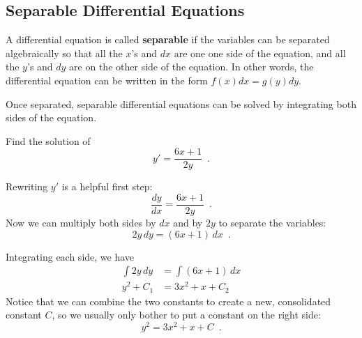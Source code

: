 
\subsection{Separable Differential Equations}
A differential equation is called {\bf separable} if the variables can be separated algebraically so that all the $x$'s and $dx$ are one one side of the equation, and all the $y$'s and $dy$ are on the other side of the equation. In other words, the differential equation can be written in the form $f(x)dx = g(y)dy$.

Once separated, separable differential equations can be solved by integrating both sides of the equation.

\begin{example}
Find the solution of
$$y'=\frac{6x+1}{2y} \enspace .$$

\begin{solution}
  Rewriting $y'$ is a helpful first step:
$$\frac{dy}{dx} = \frac{6x+1}{2y} \enspace .$$
Now we can multiply both sides by $dx$ and by $2y$ to separate the variables:
$$ 2y\, dy = (6x+1)\, dx \enspace .$$

Integrating each side, we have
\begin{align*}
  \int 2y\,dy &= \int (6x+1)\,dx \\
  y^2+C_1     &= 3x^2+x+C_2
\end{align*}
Notice that we can combine the two constants to create a new, consolidated constant $C$, so we usually only bother to put a constant on the right side:
$$y^2 = 3x^2+x + C \enspace .$$
\end{solution}\end{example}

